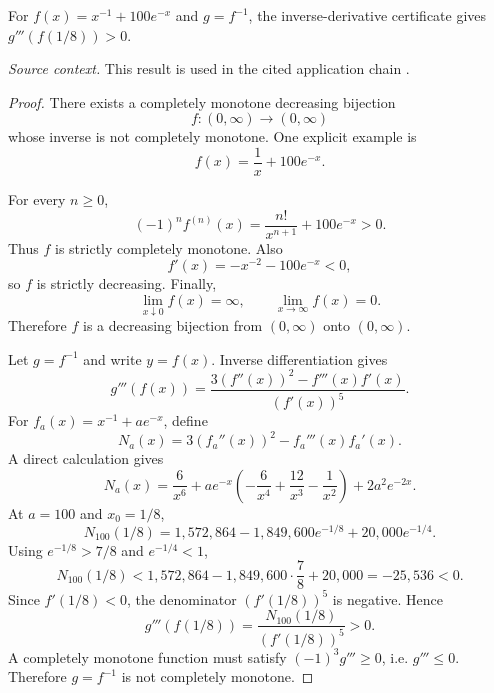 \begin{proposition}
\label{res:keady-inverse-third-derivative-sign-certificate}
For \(f(x)=x^{-1}+100e^{-x}\) and \(g=f^{-1}\), the inverse-derivative certificate gives \(g'''(f(1/8))>0\).

\emph{Source context.} This result is used in the cited application chain \cite{app-app-0035-source}.
\end{proposition}
\begin{proof}
There exists a completely monotone decreasing bijection
\[
f:(0,\infty)\to(0,\infty)
\]
whose inverse is not completely monotone. One explicit example is
\[
f(x)=\frac1x+100e^{-x}.
\]

For every \(n\ge0\),
\[
(-1)^n f^{(n)}(x)=\frac{n!}{x^{n+1}}+100e^{-x}>0.
\]
Thus \(f\) is strictly completely monotone. Also
\[
f'(x)=-x^{-2}-100e^{-x}<0,
\]
so \(f\) is strictly decreasing. Finally,
\[
\lim_{x\downarrow0}f(x)=\infty,
\qquad
\lim_{x\to\infty}f(x)=0.
\]
Therefore \(f\) is a decreasing bijection from \((0,\infty)\) onto \((0,\infty)\).

Let \(g=f^{-1}\) and write \(y=f(x)\). Inverse differentiation gives
\[
g'''(f(x))=\frac{3(f''(x))^2-f'''(x)f'(x)}{(f'(x))^5}.
\]
For \(f_a(x)=x^{-1}+ae^{-x}\), define
\[
N_a(x)=3(f_a''(x))^2-f_a'''(x)f_a'(x).
\]
A direct calculation gives
\[
N_a(x)=\frac6{x^6}+ae^{-x}\left(-\frac6{x^4}+\frac{12}{x^3}-\frac1{x^2}\right)+2a^2e^{-2x}.
\]
At \(a=100\) and \(x_0=1/8\),
\[
N_{100}(1/8)=1{,}572{,}864-1{,}849{,}600e^{-1/8}+20{,}000e^{-1/4}.
\]
Using \(e^{-1/8}>7/8\) and \(e^{-1/4}<1\),
\[
N_{100}(1/8)<1{,}572{,}864-1{,}849{,}600\cdot\frac78+20{,}000=-25{,}536<0.
\]
Since \(f'(1/8)<0\), the denominator \((f'(1/8))^5\) is negative. Hence
\[
g'''(f(1/8))=\frac{N_{100}(1/8)}{(f'(1/8))^5}>0.
\]
A completely monotone function must satisfy \((-1)^3g'''\ge0\), i.e. \(g'''\le0\). Therefore \(g=f^{-1}\) is not completely monotone.
\end{proof}


